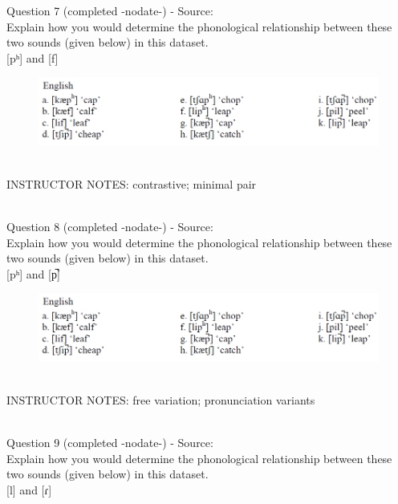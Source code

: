 \documentclass[12pt]{article}
\begin{document}
{\large Question 7} (completed -nodate-) - Source: \\

Explain how you would determine the phonological relationship between these two sounds (given below) in this dataset.\\

{[pʰ]} and {[f]}

\begin{figure}[H]
\includegraphics{../images/english_labials.png}
\end{figure}

~\\
INSTRUCTOR NOTES: contrastive; minimal pair


~\\

{\large Question 8} (completed -nodate-) - Source: \\

Explain how you would determine the phonological relationship between these two sounds (given below) in this dataset.\\

{[pʰ]} and {[p̚]}

\begin{figure}[H]
\includegraphics{../images/english_labials.png}
\end{figure}

~\\
INSTRUCTOR NOTES: free variation; pronunciation variants


~\\

{\large Question 9} (completed -nodate-) - Source: \\

Explain how you would determine the phonological relationship between these two sounds (given below) in this dataset.\\

{[l]} and {[ɾ]}
\end{document}
